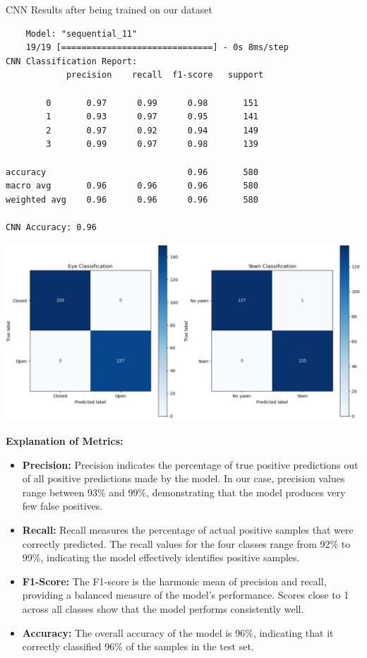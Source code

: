 \documentclass{modeleRapport}
\begin{document}
\begin{codebox}[OutputG]{ CNN Results after being trained on our dataset}
    \begin{lstlisting}
    Model: "sequential_11"
    19/19 [==============================] - 0s 8ms/step
CNN Classification Report:
            precision    recall  f1-score   support

        0       0.97      0.99      0.98       151
        1       0.93      0.97      0.95       141
        2       0.97      0.92      0.94       149
        3       0.99      0.97      0.98       139

accuracy                            0.96       580
macro avg       0.96      0.96      0.96       580
weighted avg    0.96      0.96      0.96       580

CNN Accuracy: 0.96
    \end{lstlisting}

\includegraphics[width=14cm]{Images/CNN_cm.png}

\end{codebox}
\newpage
\textbf{Explanation of Metrics:}\\
\begin{itemize}
    \item \textbf{Precision:} Precision indicates the percentage of true positive predictions out of all positive 
    predictions made by the model. In our case, precision values range between 93\% and 99\%, demonstrating that the 
    model produces very few false positives.
    \item \textbf{Recall:} Recall measures the percentage of actual positive samples that were correctly predicted. 
    The recall values for the four classes range from 92\% to 99\%, indicating the model effectively identifies positive 
    samples.
    \item \textbf{F1-Score:} The F1-score is the harmonic mean of precision and recall, providing a balanced measure of 
    the model's performance. Scores close to 1 across all classes show that the model performs consistently well.
    \item \textbf{Accuracy:} The overall accuracy of the model is 96\%, indicating that it correctly classified 96\% of the 
    samples in the test set.\\
\end{itemize}
\end{document}
